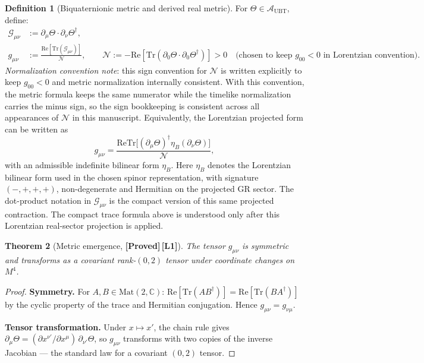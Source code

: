 \documentclass[12pt,a4paper]{article}
\newtheorem{theorem}{Theorem}[section]
\theoremstyle{definition}
\newtheorem{definition}[theorem]{Definition}
\theoremstyle{remark}
\newcommand{\PROVED}{\textbf{[Proved]}}
\newcommand{\Lone}{\textbf{[L1]}}
\newcommand{\CC}{\mathbb{C}}
\newcommand{\Tr}{\mathrm{Tr}}
\newcommand{\re}{\mathrm{Re}}
\newcommand{\calA}{\mathcal{A}}
\newcommand{\calG}{\mathcal{G}}
\newcommand{\calN}{\mathcal{N}}
\begin{document}
\begin{definition}[Biquaternionic metric and derived real metric]
\label{def:metric}
For $\Theta \in \calA_{\mathrm{UBT}}$, define:
\begin{align}
  \calG_{\mu\nu} &:= \partial_\mu\Theta \cdot \partial_\nu\Theta^\dagger, \\
  g_{\mu\nu} &:= \frac{\re[\Tr(\calG_{\mu\nu})]}{\calN},
  \qquad
  \calN := -\re[\Tr(\partial_0\Theta \cdot \partial_0\Theta^\dagger)] > 0
  \quad\text{(chosen to keep } g_{00}<0\text{ in Lorentzian convention).}
\end{align}
\emph{Normalization convention note}: this sign convention for $\calN$ is written
explicitly to keep $g_{00}<0$ and metric normalization internally consistent.
With this convention, the metric formula keeps the same numerator while the
timelike normalization carries the minus sign, so the sign bookkeeping is
consistent across all appearances of $\calN$ in this manuscript.
Equivalently, the Lorentzian projected form can be written as
\[
  g_{\mu\nu}
  = \frac{\re\!\Tr\!\bigl[(\partial_\mu\Theta)^\dagger \eta_B (\partial_\nu\Theta)\bigr]}{\calN},
\]
with an admissible indefinite bilinear form $\eta_B$.
Here $\eta_B$ denotes the Lorentzian bilinear form used in the chosen spinor
representation, with signature $(-,+,+,+)$, non-degenerate and Hermitian on
the projected GR sector.
The dot-product notation in $\calG_{\mu\nu}$ is the compact version of this
same projected contraction.
The compact trace formula above is understood only after this Lorentzian
real-sector projection is applied.
\end{definition}

\begin{theorem}[Metric emergence, \PROVED\,\Lone]
\label{thm:metric}
The tensor $g_{\mu\nu}$ is symmetric and transforms as a covariant
rank-$(0,2)$ tensor under coordinate changes on $M^4$.
\end{theorem}

\begin{proof}
\textbf{Symmetry.}
For $A,B \in \mathrm{Mat}(2,\CC)$:
$\re[\Tr(AB^\dagger)] = \re[\Tr(BA^\dagger)]$
by the cyclic property of the trace and Hermitian conjugation.
Hence $g_{\mu\nu} = g_{\nu\mu}$.

\textbf{Tensor transformation.}
Under $x \mapsto x'$, the chain rule gives
$\partial_\mu\Theta = (\partial x^{\nu'}/\partial x^\mu)\,\partial_{\nu'}\Theta$,
so $g_{\mu\nu}$ transforms with two copies of the inverse Jacobian ---
the standard law for a covariant $(0,2)$ tensor.
\end{proof}
\end{document}
